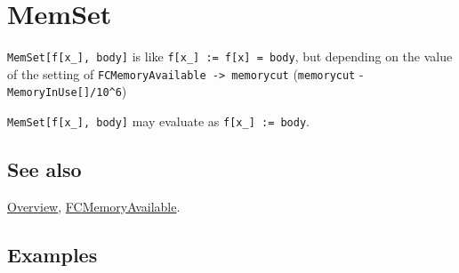 \documentclass[../FeynCalcManual.tex]{subfiles}
\begin{document}
\hypertarget{memset}{
\section{MemSet}\label{memset}}

\texttt{MemSet[\allowbreak{}f[\allowbreak{}x_],\ \allowbreak{}body]} is
like \texttt{f[\allowbreak{}x_] := f[\allowbreak{}x] = body}, but
depending on the value of the setting of
\texttt{FCMemoryAvailable -> memorycut} (\texttt{memorycut} -
\texttt{MemoryInUse[\allowbreak{}]/10^6})

\texttt{MemSet[\allowbreak{}f[\allowbreak{}x_],\ \allowbreak{}body]} may
evaluate as \texttt{f[\allowbreak{}x_] := body}.

\subsection{See also}

\hyperlink{toc}{Overview},
\hyperlink{fcmemoryavailable}{FCMemoryAvailable}.

\subsection{Examples}
\end{document}
